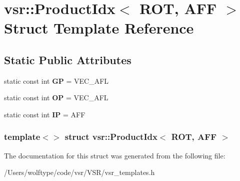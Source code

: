 \hypertarget{structvsr_1_1_product_idx_3_01_r_o_t_00_01_a_f_f_01_4}{\section{vsr\-:\-:Product\-Idx$<$ R\-O\-T, A\-F\-F $>$ Struct Template Reference}
\label{structvsr_1_1_product_idx_3_01_r_o_t_00_01_a_f_f_01_4}
}
\subsection*{Static Public Attributes}
\begin{DoxyCompactItemize}
\item 
\hypertarget{structvsr_1_1_product_idx_3_01_r_o_t_00_01_a_f_f_01_4_a9fdf01b4cfc457866d0ef15695582681}{static const int {\bfseries G\-P} = V\-E\-C\-\_\-\-A\-F\-L}\label{structvsr_1_1_product_idx_3_01_r_o_t_00_01_a_f_f_01_4_a9fdf01b4cfc457866d0ef15695582681}

\item 
\hypertarget{structvsr_1_1_product_idx_3_01_r_o_t_00_01_a_f_f_01_4_a8ddd1b947541250dc55e2069ed624f57}{static const int {\bfseries O\-P} = V\-E\-C\-\_\-\-A\-F\-L}\label{structvsr_1_1_product_idx_3_01_r_o_t_00_01_a_f_f_01_4_a8ddd1b947541250dc55e2069ed624f57}

\item 
\hypertarget{structvsr_1_1_product_idx_3_01_r_o_t_00_01_a_f_f_01_4_a5d4de43426e7ca32d134c0ad3c447055}{static const int {\bfseries I\-P} = A\-F\-F}\label{structvsr_1_1_product_idx_3_01_r_o_t_00_01_a_f_f_01_4_a5d4de43426e7ca32d134c0ad3c447055}

\end{DoxyCompactItemize}
\subsubsection*{template$<$$>$ struct vsr\-::\-Product\-Idx$<$ R\-O\-T, A\-F\-F $>$}



The documentation for this struct was generated from the following file\-:\begin{DoxyCompactItemize}
\item 
/\-Users/wolftype/code/vsr/\-V\-S\-R/vsr\-\_\-templates.\-h\end{DoxyCompactItemize}
